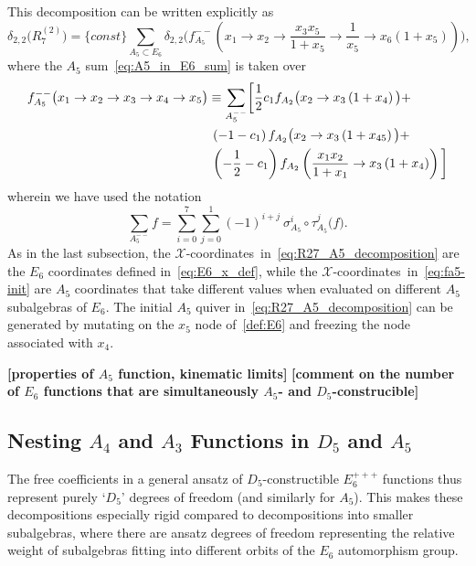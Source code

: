 \documentclass[11pt]{article}
\def\nl{\nonumber\\}
\def\xcoords{$\mathcal{X}$-coordinates}
\def\draftnote#1{{\bf [#1]}}
\begin{document}
This decomposition can be written explicitly as
\begin{equation}
\delta_{2,2}\big(R^{(2)}_7 \big) = \{ const \} \sum_{A_5\subset E_6} \delta_{2,2} \Big(f_{A_5}^{--} \left(x_1\to x_2\to \frac{x_3 x_5}{1+x_5} \to \frac{1}{x_5}  \to x_6 (1+x_5) \right) \Big), \label{eq:R27_A5_decomposition}
\end{equation}
where the $A_5$ sum~\eqref{eq:A5_in_E6_sum} is taken over
\begin{align}
	f_{A_5}^{--}\big( x_1\to x_2\to x_3 \to x_4  \to x_5 \big) \equiv \sum_{A_5^{--}} 
	& \bigg[ \frac{1}{2} c_1 f_{A_2}\big(x_2\to x_3 \left(1+x_4\right)\big) + \nl
	&\hspace{-1cm}\left(-1-c_1\right) f_{A_2}\big(x_2\to x_3 \left(1+x_{45}\right)\big) + \nl 
	&\hspace{-1cm}\left(-\frac{1}{2}-c_1\right) f_{A_2}\left(\frac{x_1 x_2}{1+x_1}\to x_3 \left(1+x_4\right)\right) \bigg] \label{eq:fa5-init}
\end{align}
wherein we have used the notation
\begin{equation}
\sum_{A_5^{--}} f = \sum_{i=0}^7 \sum_{j=0}^1 (-1)^{i+j} \ \sigma_{A_5}^i \circ \tau_{A_5}^j \big(f \big).
\end{equation}
As in the last subsection, the \xcoords\ in~\eqref{eq:R27_A5_decomposition} are the $E_6$ coordinates defined in~\eqref{eq:E6_x_def}, while the \xcoords\ in~\eqref{eq:fa5-init} are $A_5$ coordinates that take different values when evaluated on different $A_5$ subalgebras of $E_6$. The initial $A_5$ quiver in~\eqref{eq:R27_A5_decomposition} can be generated by mutating on the $x_5$ node of~\eqref{def:E6} and freezing the node associated with $x_4$.

\draftnote{properties of $A_5$ function, kinematic limits}
\draftnote{comment on the number of $E_6$ functions that are simultaneously $A_5$- and $D_5$-construcible}

\subsection{Nesting $A_4$ and $A_3$ Functions in $D_5$ and $A_5$} \label{sec:a4_a3_nestings}

The free coefficients in a general ansatz of $D_5$-constructible $E_6^{+++}$ functions thus represent purely `$D_5$' degrees of freedom (and similarly for $A_5$). This makes these decompositions especially rigid compared to decompositions into smaller subalgebras, where there are ansatz degrees of freedom representing the relative weight of subalgebras fitting into different orbits of the $E_6$ automorphism group. 
\end{document}

